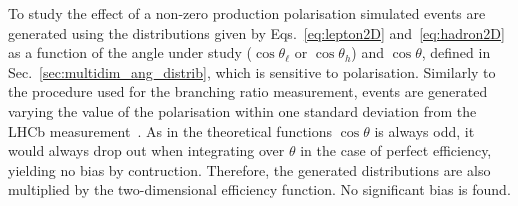 To study the effect of a non-zero \Lb production polarisation simulated events are generated 
using the distributions given by Eqs.~\ref{eq:lepton2D} and~\ref{eq:hadron2D} as a function of the
angle under study ($\cos\theta_\ell$ or $\cos\theta_h$) and $\cos\theta$, defined in Sec.~\ref{sec:multidim_ang_distrib}, 
which is sensitive to polarisation.
Similarly to the procedure used for the branching ratio measurement, events are generated varying
the value of the polarisation within one standard deviation from the LHCb measurement~\cite{Aaij:2013oxa}.
As in the theoretical functions $\cos \theta$ is always odd, it would always
drop out when integrating over $\theta$ in the case of perfect efficiency, yielding no bias by contruction. Therefore, the 
generated distributions are also multiplied by the two-dimensional efficiency function. No significant bias is found.





